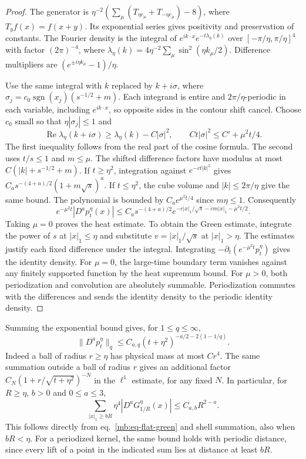 \documentclass[11pt,letterpaper,reqno]{amsart}
\numberwithin{equation}{section}
\renewcommand{\eqref}[1]{\textup{eq.~\ref{#1}}}
\theoremstyle{definition}
\theoremstyle{remark}
\begin{document}
\begin{proof}
The generator is \(\eta^{-2}(\sum_{\mu}(T_{\eta e_\mu}
+T_{-\eta e_\mu})-8)\), where \(T_y f(x)=f(x+y)\).
Its exponential series gives positivity and preservation of constants.
The Fourier density is the integral of
\(e^{ik\cdot x}e^{-t\lambda_\eta(k)}\) over \([-\pi/\eta,\pi/\eta]^4\)
with factor \((2\pi)^{-4}\), where
\(\lambda_\eta(k)=4\eta^{-2}\sum_\mu\sin^2(\eta k_\mu/2)\).
Difference multipliers are \((e^{\pm i\eta k_\mu}-1)/\eta\).

Use the same integral with \(k\) replaced by \(k+i\sigma\), where
\(\sigma_j=c_0\operatorname{sgn}(x_j)(s^{-1/2}+m)\).
Each integrand is entire and \(2\pi/\eta\)-periodic in each variable,
including \(e^{ik\cdot x}\), so opposite sides in the contour shift cancel.
Choose \(c_0\) small so that \(\eta|\sigma_j|\le1\) and
\[
 \operatorname{Re}\lambda_\eta(k+i\sigma)
 \ge \lambda_\eta(k)-C|\sigma|^2,\qquad
 Ct|\sigma|^2\le C' +\mu^2t/4 .
\]
The first inequality follows from the real part of the cosine formula.
The second uses \(t/s\le1\) and \(m\le\mu\). The shifted difference
factors have modulus at most \(C(|k|+s^{-1/2}+m)\).
If \(t\ge\eta^2\), integration against \(e^{-ct|k|^2}\) gives
\(C_a s^{-(4+a)/2}(1+m\sqrt s)^a\). If \(t\le\eta^2\),
the cube volume and \(|k|\le2\pi/\eta\) give the same bound.
The polynomial is bounded by \(C_a e^{\mu^2t/4}\) since \(m\eta\le1\).
Consequently
\[
 e^{-\mu^2t}|D^a p_t^\eta(x)|
 \le C_a s^{-(4+a)/2}
       e^{-c|x|_1/\sqrt s-cm|x|_1-\mu^2t/2}.
\]
Taking \(\mu=0\) proves the heat estimate. To obtain the
Green estimate, integrate the power of \(s\) at \(|x|_1\le\eta\)
and substitute \(v=|x|_1/\sqrt s\) at \(|x|_1>\eta\).
The estimates justify each fixed difference under the integral.
Integrating \(-\partial_t(e^{-\mu^2t}p_t^\eta)\) gives the identity
density. For \(\mu=0\), the large-time boundary term vanishes against
any finitely supported function by the heat supremum bound.
For \(\mu>0\), both periodization and convolution are absolutely
summable. Periodization commutes with the differences and sends the
identity density to the periodic identity density.
\end{proof}

Summing the exponential bound gives, for \(1\le q\le\infty\),
\begin{equation}\label{mb:eq-heat-lq}
 \|D^a p_t^\eta\|_q\le C_{a,q}(t+\eta^2)^{-a/2-2(1-1/q)}.
\end{equation}
Indeed a ball of radius \(r\ge\eta\) has physical mass at most \(Cr^4\).
The same summation outside a ball of radius \(r\) gives an additional
factor \(C_N(1+r/\sqrt{t+\eta^2})^{-N}\) in the \(\ell^1\) estimate,
for any fixed \(N\). In particular, for \(R\ge\eta\), \(b>0\) and
\(0\le a\le3\),
\begin{equation}\label{mb:eq-massive-off-diagonal}
 \sum_{|x|_1\ge bR}\eta^4 |D^aG_{1/R}^\eta(x)|
                    \le C_{a,b}R^{2-a}.
\end{equation}
This follows directly from \eqref{mb:eq-flat-green} and shell
summation, also when \(bR<\eta\). For a periodized kernel, the same
bound holds with periodic distance, since every lift of a point
in the indicated sum lies at distance at least \(bR\).
\end{document}
